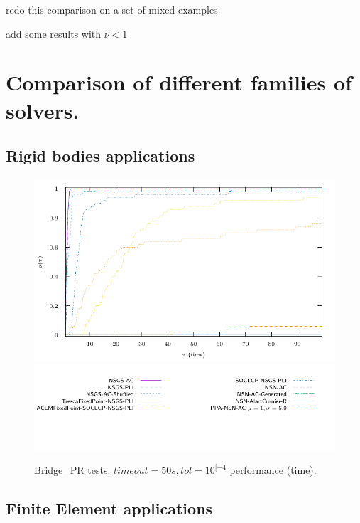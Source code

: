 \begin{ndrva}
  \item redo this comparison on a set of mixed examples 
  \item add some results with $\nu < 1 $
\end{ndrva}


\section{Comparison of different families of solvers.}


\subsection{Rigid bodies applications}
\begin{figure}
  \centering
  \includegraphics[width=\widthfigure\textwidth]{../figure/profile-LMGC_Bridge_PR-time_0_100.pdf}
  \includegraphics[width=\widthfigure\textwidth]{../figure/profile-LMGC_Bridge_PR_legend-time_0_100.pdf}
  \caption{Bridge\_PR tests. $timeout=50s, tol = 10^{[-4} $ performance (time). }
  \label{fig:profile-LMGC_Bridge_PR-time}
\end{figure}



\subsection{Finite Element applications}

